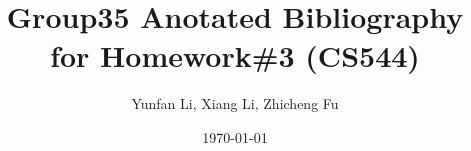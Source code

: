 \usepackage{multibib}




\title{Group35 Anotated Bibliography for Homework\#3 (CS544)}
\author{Yunfan Li, Xiang Li, Zhicheng Fu}
\date{\today}
\maketitle


\pagebreak

\appendix

\nocite{*}




